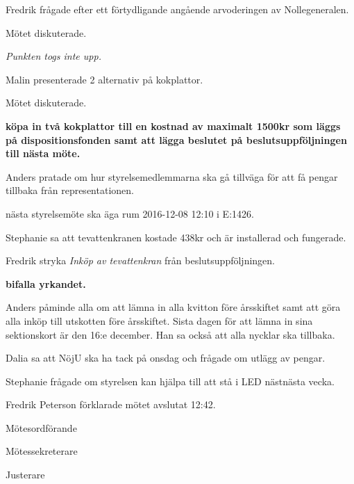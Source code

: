 \documentclass[10pt]{article}
\def\mo{Fredrik Peterson}
\def\ms{Erik Månsson}
\def\ji{Stephanie Mirsky}
\begin{document}
\begin{paragrafer}
\begin{paragrafer}
Fredrik frågade efter ett förtydligande angående arvoderingen av Nollegeneralen.

Mötet diskuterade.

\emph{Punkten togs inte upp.}

\end{paragrafer}

Malin presenterade 2 alternativ på kokplattor.

Mötet diskuterade.

\textbf{\Mba köpa in två kokplattor till en kostnad av maximalt 1500kr som läggs på dispositionsfonden samt att lägga beslutet på beslutsuppföljningen till nästa möte.}

Anders pratade om hur styrelsemedlemmarna ska gå tillväga för att få pengar tillbaka från representationen.

{\Mba} nästa styrelsemöte ska äga rum 2016-12-08 12:10 i E:1426.

Stephanie sa att tevattenkranen kostade 438kr och är installerad och fungerade.

Fredrik \ypa stryka \emph{Inköp av tevattenkran} från beslutsuppföljningen.

\textbf{\Mba bifalla yrkandet.}

Anders påminde alla om att lämna in alla kvitton före årsskiftet samt att göra alla inköp till utskotten före årsskiftet. Sista dagen för att lämna in sina sektionskort är den 16:e december. Han sa också att alla nycklar ska tillbaka.

Dalia sa att NöjU ska ha tack på onsdag och frågade om utlägg av pengar.

Stephanie frågade om styrelsen kan hjälpa till att stå i LED nästnästa vecka.

{\mo} förklarade mötet avslutat 12:42.

\end{paragrafer}

\hidesignfoot
\begin{signatures}{3}
\signature{\mo}{Mötesordförande}
\signature{\ms}{Mötessekreterare}
\signature{\ji}{Justerare}
\end{signatures}
\end{document}
